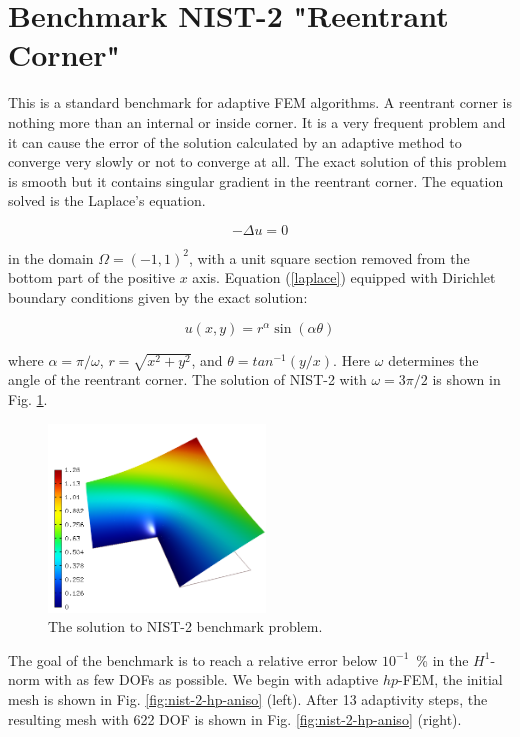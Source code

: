 \section{Benchmark NIST-2 "Reentrant Corner"}
\label{sec:bench-2}

This is a standard benchmark for adaptive FEM algorithms.
A reentrant corner is nothing more than an internal or inside corner.
It is a very frequent problem and it can cause the error of the solution
calculated by an adaptive method to converge very slowly or not to converge at all.
The exact solution of this problem is smooth but it contains
singular gradient in the reentrant corner.
The equation solved is the Laplace's equation.

\begin{equation} \label{laplace}
-\Delta u = 0 
\end{equation}

in the domain $\Omega = (-1, 1)^2$, with a unit square
section removed from the bottom part of the positive $x$ axis.
Equation (\ref{laplace}) equipped with Dirichlet
boundary conditions given by the exact solution:

\begin{equation}\label{exact-nist-2}
u(x, y) = r^{\alpha}\sin(\alpha \theta)
\end{equation}

where $\alpha = \pi / \omega$, $r = \sqrt{x^2+y^2}$,
and $\theta = tan^{-1}(y/x)$. Here $\omega $ determines
the angle of the reentrant corner.
The solution of NIST-2 with $\omega = 3 \pi / 2$
is shown in Fig. \ref{fig:sln-nist02}.

\begin{figure}[!ht]
\centering
\includegraphics[height=5cm]{nist/nist-2/solution.png}
\caption{The solution to NIST-2 benchmark problem.}
\label{fig:sln-nist02}
\end{figure}

The goal of the benchmark is to reach a relative error below
$10^{-1}$~\% in the $H^1$-norm with as few DOFs as possible.
We begin with adaptive $hp$-FEM,
the initial mesh is shown in Fig. \ref{fig:nist-2-hp-aniso} (left).
After 13 adaptivity steps, the resulting mesh with 622 DOF is shown
in Fig. \ref{fig:nist-2-hp-aniso} (right).

